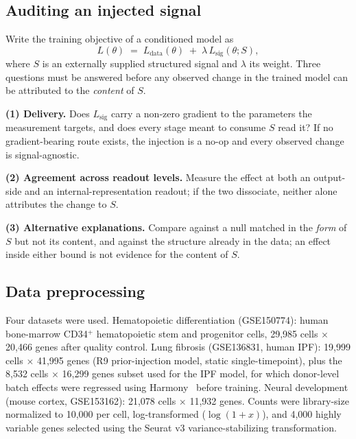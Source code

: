 
\subsection*{Auditing an injected signal}

Write the training objective of a conditioned model as
\begin{equation}
L(\theta) \;=\; L_{\text{data}}(\theta) \;+\; \lambda\,L_{\text{sig}}(\theta; S),
\end{equation}
where $S$ is an externally supplied structured signal and $\lambda$ its weight.
Three questions must be answered before any observed change in the trained model
can be attributed to the \emph{content} of $S$.

\textbf{(1) Delivery.} Does $L_{\text{sig}}$ carry a non-zero gradient to the parameters the measurement targets, and does every stage meant to consume $S$ read it? If no gradient-bearing route exists, the injection is a no-op and every observed change is signal-agnostic.

\textbf{(2) Agreement across readout levels.} Measure the effect at both an output-side and an internal-representation readout; if the two dissociate, neither alone attributes the change to $S$.

\textbf{(3) Alternative explanations.} Compare against a null matched in the \emph{form} of $S$ but not its content, and against the structure already in the data; an effect inside either bound is not evidence for the content of $S$.

\subsection*{Data preprocessing}

Four datasets were used. Hematopoietic differentiation (GSE150774): human bone-marrow CD34$^+$ hematopoietic stem and progenitor cells, 29,985 cells $\times$ 20,466 genes after quality control. Lung fibrosis (GSE136831, human IPF): 19,999 cells $\times$ 41,995 genes (R9 prior-injection model, static single-timepoint), plus the 8,532 cells $\times$ 16,299 genes subset used for the IPF model, for which donor-level batch effects were regressed using Harmony~\cite{korsunsky2019} before training. Neural development (mouse cortex, GSE153162): 21,078 cells $\times$ 11,932 genes. Counts were library-size normalized to 10,000 per cell, log-transformed ($\log(1+x)$), and 4,000 highly variable genes selected using the Seurat v3 variance-stabilizing transformation.

